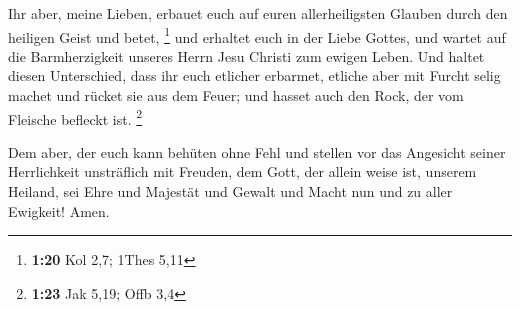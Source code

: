  Ihr aber, meine Lieben, erbauet euch auf euren
allerheiligsten Glauben durch den heiligen Geist und betet, \footnote{\textbf{1:20}
  Kol 2,7; 1Thes 5,11}  und erhaltet euch in der Liebe
Gottes, und wartet auf die Barmherzigkeit unseres Herrn Jesu Christi zum
ewigen Leben.  Und haltet diesen Unterschied, dass ihr euch
etlicher erbarmet,  etliche aber mit Furcht selig machet
und rücket sie aus dem Feuer; und hasset auch den Rock, der vom Fleische
befleckt ist. \footnote{\textbf{1:23} Jak 5,19; Offb 3,4}

 Dem aber, der euch kann behüten ohne Fehl und stellen vor
das Angesicht seiner Herrlichkeit unsträflich mit Freuden, 
dem Gott, der allein weise ist, unserem Heiland, sei Ehre und Majestät
und Gewalt und Macht nun und zu aller Ewigkeit! Amen.
